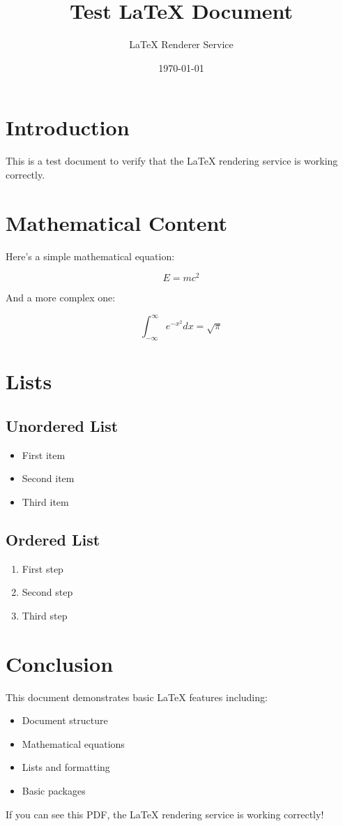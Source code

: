 \documentclass[11pt,a4paper]{article}
\title{Test LaTeX Document}
\author{LaTeX Renderer Service}
\date{\today}
\begin{document}
\maketitle

\section{Introduction}

This is a test document to verify that the LaTeX rendering service is working correctly.

\section{Mathematical Content}

Here's a simple mathematical equation:

\begin{equation}
E = mc^2
\end{equation}

And a more complex one:

\begin{equation}
\int_{-\infty}^{\infty} e^{-x^2} dx = \sqrt{\pi}
\end{equation}

\section{Lists}

\subsection{Unordered List}
\begin{itemize}
    \item First item
    \item Second item
    \item Third item
\end{itemize}

\subsection{Ordered List}
\begin{enumerate}
    \item First step
    \item Second step
    \item Third step
\end{enumerate}

\section{Conclusion}

This document demonstrates basic LaTeX features including:
\begin{itemize}
    \item Document structure
    \item Mathematical equations
    \item Lists and formatting
    \item Basic packages
\end{itemize}

If you can see this PDF, the LaTeX rendering service is working correctly!
\end{document}
